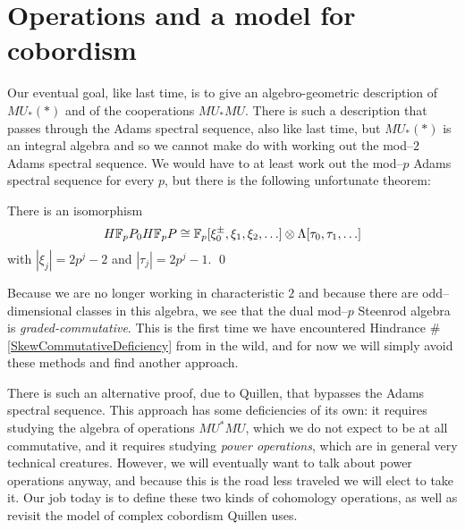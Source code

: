 









\section{Operations and a model for cobordism}

Our eventual goal, like last time, is to give an algebro-geometric description of $MU_*(*)$ and of the cooperations $MU_* MU$.  There is such a description that passes through the Adams spectral sequence, also like last time, but $MU_*(*)$ is an integral algebra and so we cannot make do with working out the mod--$2$ Adams spectral sequence.  We would have to at least work out the mod--$p$ Adams spectral sequence for every $p$, but there is the following unfortunate theorem:
\begin{theorem}
There is an isomorphism
\[H\mathbb F_pP_0 H\mathbb F_pP \cong \mathbb F_p[\xi_0^\pm, \xi_1, \xi_2, \ldots] \otimes \Lambda[\tau_0, \tau_1, \ldots]\]
with $|\xi_j| = 2p^j-2$ and $|\tau_j| = 2p^j - 1$. \qed
\end{theorem}
\noindent Because we are no longer working in characteristic $2$ and because there are odd--dimensional classes in this algebra, we see that the dual mod--$p$ Steenrod algebra is \emph{graded-commutative}.  This is the first time we have encountered Hindrance \#\ref{SkewCommutativeDeficiency} from  in the wild, and for now we will simply avoid these methods and find another approach.

There is such an alternative proof, due to Quillen, that bypasses the Adams spectral sequence.  This approach has some deficiencies of its own: it requires studying the algebra of operations $MU^* MU$, which we do not expect to be at all commutative, and it requires studying \textit{power operations}, which are in general very technical creatures.  However, we will eventually want to talk about power operations anyway, and because this is the road less traveled we will elect to take it.  Our job today is to define these two kinds of cohomology operations, as well as revisit the model of complex cobordism Quillen uses.

